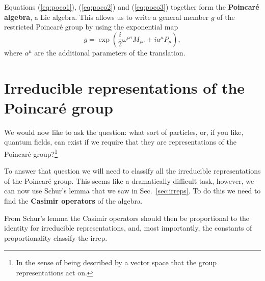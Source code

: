 \documentclass[notes.tex]{subfiles}
\begin{document}
Equations (\ref{eq:poco1}), (\ref{eq:poco2}) and (\ref{eq:poco3}) together form the {\bf Poincaré algebra}, a Lie algebra. This allows us to write a general member $g$ of the restricted Poincaré group by using the exponential map 
\begin{equation}
g=\exp\left(\frac{i}{2}\omega^{\rho \sigma}M_{\rho \sigma}+ia^\mu P_\mu\right),
\end{equation}
where $a^\mu$ are the additional parameters of the translation. 



\section{Irreducible representations of the Poincaré group}

We would now like to ask the question: what sort of particles, or, if you like, quantum fields, can exist if we require that they are representations of the Poincaré group?\footnote{In the sense of being described by a vector space that the group representations act on.}

To answer that question we will need to classify all the irreducible representations of the Poincaré group. This seems like a dramatically difficult task, however, we can now use Schur's lemma that we saw in Sec.~\ref{sec:irreps}. To do this we need to find the {\bf Casimir operators} of the algebra.

From Schur's lemma the Casimir operators should then be proportional to the identity for irreducible representations, and, most importantly, the constants of proportionality classify the irrep.
\end{document}
